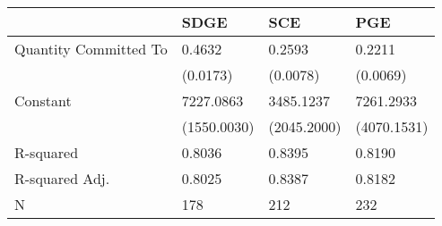 \begin{tabular}{llll}
\hline
                      & SDGE        & SCE         & PGE          \\
\hline
Quantity Committed To & 0.4632      & 0.2593      & 0.2211       \\
                      & (0.0173)    & (0.0078)    & (0.0069)     \\
Constant              & 7227.0863   & 3485.1237   & 7261.2933    \\
                      & (1550.0030) & (2045.2000) & (4070.1531)  \\
R-squared             & 0.8036      & 0.8395      & 0.8190       \\
R-squared Adj.        & 0.8025      & 0.8387      & 0.8182       \\
N                     & 178         & 212         & 232          \\
\hline
\end{tabular}